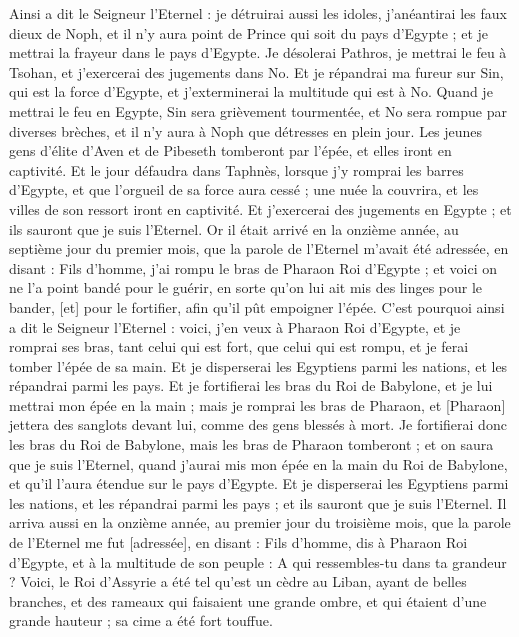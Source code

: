 \begin{multicols}{2}
Ainsi a dit le Seigneur l'Eternel : je détruirai aussi les idoles, j'anéantirai les faux dieux de Noph, et il n'y aura point de Prince qui soit du pays d'Egypte ; et je mettrai la frayeur dans le pays d'Egypte.
Je désolerai Pathros, je mettrai le feu à Tsohan, et j'exercerai des jugements dans No.
Et je répandrai ma fureur sur Sin, qui est la force d'Egypte, et j'exterminerai la multitude qui est à No.
Quand je mettrai le feu en Egypte, Sin sera grièvement tourmentée, et No sera rompue par diverses brèches, et il n'y aura à Noph que détresses en plein jour.
Les jeunes gens d'élite d'Aven et de Pibeseth tomberont par l'épée, et elles iront en captivité.
Et le jour défaudra dans Taphnès, lorsque j'y romprai les barres d'Egypte, et que l'orgueil de sa force aura cessé ; une nuée la couvrira, et les villes de son ressort iront en captivité.
Et j'exercerai des jugements en Egypte ; et ils sauront que je suis l'Eternel.
Or il était arrivé en la onzième année, au septième jour du premier mois, que la parole de l'Eternel m'avait été adressée, en disant :
Fils d'homme, j'ai rompu le bras de Pharaon Roi d'Egypte ; et voici on ne l'a point bandé pour le guérir, en sorte qu'on lui ait mis des linges pour le bander, [et] pour le fortifier, afin qu'il pût empoigner l'épée.
C'est pourquoi ainsi a dit le Seigneur l'Eternel : voici, j'en veux à Pharaon Roi d'Egypte, et je romprai ses bras, tant celui qui est fort, que celui qui est rompu, et je ferai tomber l'épée de sa main.
Et je disperserai les Egyptiens parmi les nations, et les répandrai parmi les pays.
Et je fortifierai les bras du Roi de Babylone, et je lui mettrai mon épée en la main ; mais je romprai les bras de Pharaon, et [Pharaon] jettera des sanglots devant lui, comme des gens blessés à mort.
Je fortifierai donc les bras du Roi de Babylone, mais les bras de Pharaon tomberont ; et on saura que je suis l'Eternel, quand j'aurai mis mon épée en la main du Roi de Babylone, et qu'il l'aura étendue sur le pays d'Egypte.
Et je disperserai les Egyptiens parmi les nations, et les répandrai parmi les pays ; et ils sauront que je suis l'Eternel.
\VerseOne{}Il arriva aussi en la onzième année, au premier jour du troisième mois, que la parole de l'Eternel me fut [adressée], en disant :
Fils d'homme, dis à Pharaon Roi d'Egypte, et à la multitude de son peuple : A qui ressembles-tu dans ta grandeur ?
Voici, le Roi d'Assyrie a été tel qu'est un cèdre au Liban, ayant de belles branches, et des rameaux qui faisaient une grande ombre, et qui étaient d'une grande hauteur ; sa cime a été fort touffue.

\end{multicols}
